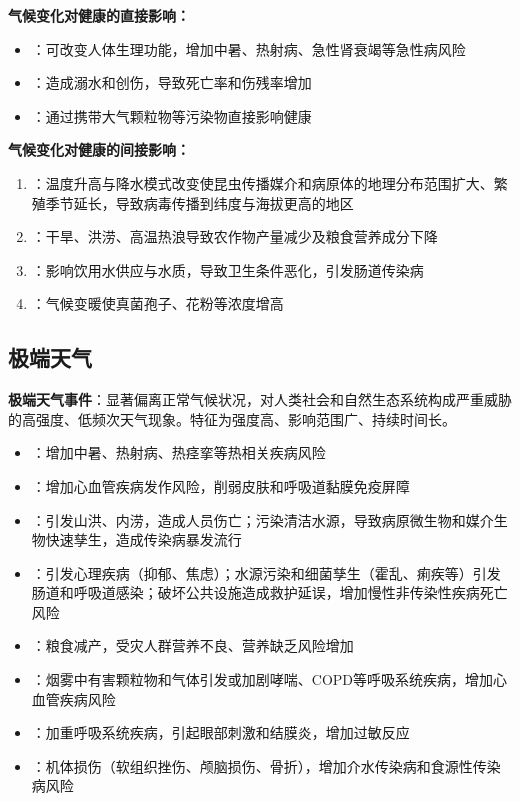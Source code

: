 \documentclass[10pt,a4paper,oneside]{ctexbook}
\begin{document}
\begin{keybox}
\textbf{气候变化对健康的直接影响：}
\begin{itemize}[leftmargin=*]
    \item {}：可改变人体生理功能，增加中暑、热射病、急性肾衰竭等急性病风险
    \item {}：造成溺水和创伤，导致死亡率和伤残率增加
    \item {}：通过携带大气颗粒物等污染物直接影响健康
\end{itemize}

\textbf{气候变化对健康的间接影响：}
\begin{enumerate}[leftmargin=*]
    \item {}：温度升高与降水模式改变使昆虫传播媒介和病原体的地理分布范围扩大、繁殖季节延长，导致病毒传播到纬度与海拔更高的地区
    \item {}：干旱、洪涝、高温热浪导致农作物产量减少及粮食营养成分下降
    \item {}：影响饮用水供应与水质，导致卫生条件恶化，引发肠道传染病
    \item {}：气候变暖使真菌孢子、花粉等浓度增高
\end{enumerate}
\end{keybox}

\subsection{极端天气}

\begin{defbox}
\textbf{极端天气事件}：显著偏离正常气候状况，对人类社会和自然生态系统构成严重威胁的高强度、低频次天气现象。特征为强度高、影响范围广、持续时间长。

\begin{itemize}[leftmargin=*]
    \item {}：增加中暑、热射病、热痉挛等热相关疾病风险
    \item {}：增加心血管疾病发作风险，削弱皮肤和呼吸道黏膜免疫屏障
    \item {}：引发山洪、内涝，造成人员伤亡；污染清洁水源，导致病原微生物和媒介生物快速孳生，造成传染病暴发流行
    \item {}：引发心理疾病（抑郁、焦虑）；水源污染和细菌孳生（霍乱、痢疾等）引发肠道和呼吸道感染；破坏公共设施造成救护延误，增加慢性非传染性疾病死亡风险
    \item {}：粮食减产，受灾人群营养不良、营养缺乏风险增加
    \item {}：烟雾中有害颗粒物和气体引发或加剧哮喘、COPD等呼吸系统疾病，增加心血管疾病风险
    \item {}：加重呼吸系统疾病，引起眼部刺激和结膜炎，增加过敏反应
    \item {}：机体损伤（软组织挫伤、颅脑损伤、骨折），增加介水传染病和食源性传染病风险
\end{itemize}
\end{defbox}
\end{document}
